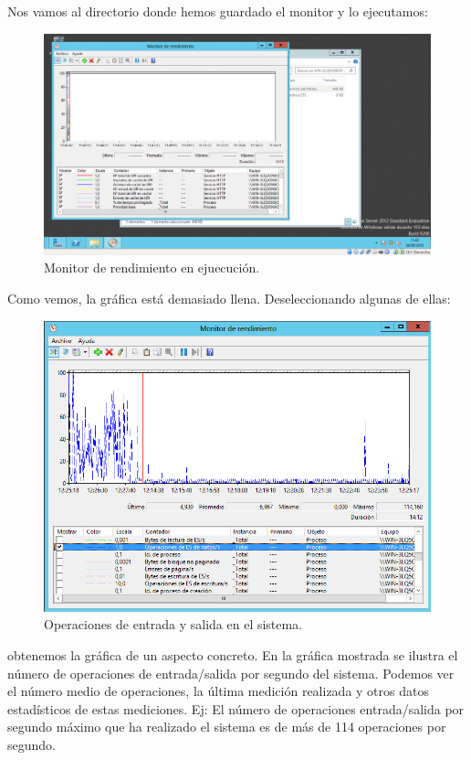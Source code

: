\begin{itemize}
		Nos vamos al directorio donde hemos guardado el monitor y lo ejecutamos:\\
		
		\begin{figure}[H]
			\centering
			\includegraphics[width=0.7\linewidth]{MonitorEnEjecucion}
			\caption[Monitor en ejecución]{Monitor de rendimiento en ejuecución.}
			\label{fig:MonitorEnEjecucion}
		\end{figure}
		
		Como vemos, la gráfica está demasiado llena. Deseleccionando algunas de ellas:\\
		\begin{figure}[H]
			\centering
			\includegraphics[width=0.7\linewidth]{WindowsOperacionesES}
			\caption[OperacionES]{Operaciones de entrada y salida en el sistema.}
			\label{fig:WindowsOperacionesES}
		\end{figure}
		
		 obtenemos la gráfica de un aspecto concreto. En la gráfica mostrada se ilustra el número de operaciones de entrada/salida por segundo del sistema. Podemos ver el número medio de operaciones, la última medición realizada y otros datos estadísticos de estas mediciones. Ej: El número de operaciones entrada/salida por segundo máximo que ha realizado el sistema es de más de 114 operaciones por segundo.
		

		
\end{itemize}

